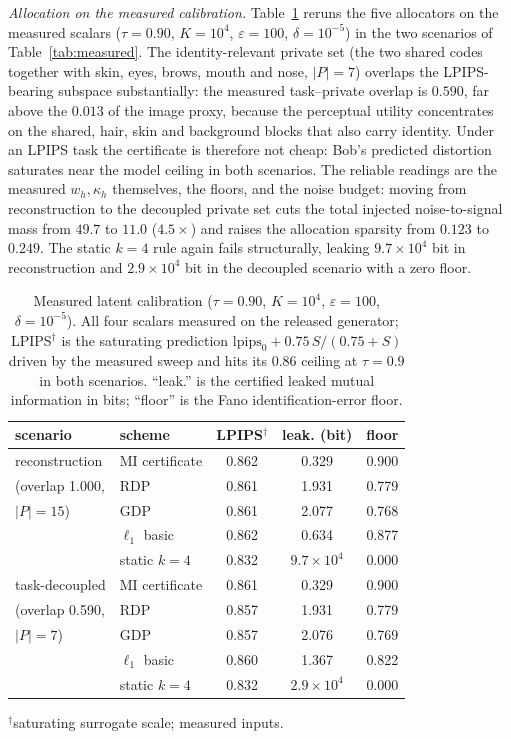 \documentclass{ieeetj}
\theoremstyle{plain}
\theoremstyle{definition}
\begin{document}
\emph{Allocation on the measured calibration.}
Table~\ref{tab:latent_alloc} reruns the five allocators on the measured
scalars ($\tau{=}0.90$, $K{=}10^{4}$, $\varepsilon{=}100$,
$\delta{=}10^{-5}$) in the two scenarios of Table~\ref{tab:measured}. The
identity-relevant private set (the two shared codes together with skin,
eyes, brows, mouth and nose, $|P|{=}7$) overlaps the LPIPS-bearing subspace
substantially: the measured task--private overlap is $0.590$, far above the
$0.013$ of the image proxy, because the perceptual utility concentrates on
the shared, hair, skin and background blocks that also carry identity. Under
an LPIPS task the certificate is therefore not cheap: Bob's predicted
distortion saturates near the model ceiling in both scenarios. The reliable
readings are the measured $w_h,\kappa_h$ themselves, the floors, and the
noise budget: moving from reconstruction to the decoupled private set cuts
the total injected noise-to-signal mass from $49.7$ to $11.0$ ($4.5\times$)
and raises the allocation sparsity from $0.123$ to $0.249$. The static
$k{=}4$ rule again fails structurally, leaking $9.7\times10^{4}$ bit in
reconstruction and $2.9\times10^{4}$ bit in the decoupled scenario with a zero
floor.

\begin{table}[t]
\centering\footnotesize
\setlength{\tabcolsep}{3.5pt}
\caption{Measured latent calibration ($\tau{=}0.90$, $K{=}10^{4}$,
$\varepsilon{=}100$, $\delta{=}10^{-5}$). All four scalars measured on the
released generator; LPIPS$^\dagger$ is the saturating prediction
$\mathrm{lpips}_0+0.75\,S/(0.75+S)$ driven by the measured sweep and hits its
$0.86$ ceiling at $\tau{=}0.9$ in both scenarios. ``leak.'' is the certified
leaked mutual information in bits; ``floor'' is the Fano identification-error
floor.}
\label{tab:latent_alloc}
\begin{tabular}{llccc}
\toprule
scenario & scheme & LPIPS$^\dagger$ & leak. (bit) & floor \\
\midrule
reconstruction & MI certificate & 0.862 & 0.329 & 0.900 \\
(overlap 1.000, & RDP            & 0.861 & 1.931 & 0.779 \\
$|P|{=}15$)    & GDP            & 0.861 & 2.077 & 0.768 \\
               & $\ell_1$ basic & 0.862 & 0.634 & 0.877 \\
               & static $k{=}4$ & 0.832 & $9.7\times10^{4}$ & 0.000 \\
\midrule
task-decoupled & MI certificate & 0.861 & 0.329 & 0.900 \\
(overlap 0.590, & RDP           & 0.857 & 1.931 & 0.779 \\
$|P|{=}7$)     & GDP            & 0.857 & 2.076 & 0.769 \\
               & $\ell_1$ basic & 0.860 & 1.367 & 0.822 \\
               & static $k{=}4$ & 0.832 & $2.9\times10^{4}$ & 0.000 \\
\bottomrule
\end{tabular}
$^\dagger$saturating surrogate scale; measured inputs.
\end{table}
\end{document}

